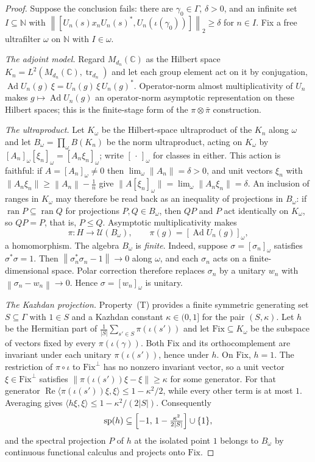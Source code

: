 \documentclass[11pt]{amsart}
\theoremstyle{definition}
\theoremstyle{remark}
\theoremstyle{plain}
\newcommand{\C}{\mathbb C}
\newcommand{\N}{\mathbb N}
\newcommand{\U}{\mathcal U}
\newcommand{\tr}{\operatorname{tr}}
\newcommand{\Ad}{\operatorname{Ad}}
\newcommand{\opnorm}[1]{\left\lVert #1\right\rVert}
\newcommand{\hsnorm}[1]{\left\lVert #1\right\rVert_{2}}
\begin{document}
\begin{proof}
Suppose the conclusion fails: there are $\gamma_0\in\Gamma$,
$\delta>0$, and an infinite set $I\subseteq\N$ with
$\hsnorm{[U_n(s)x_nU_n(s)^*,U_n(\iota(\gamma_0))]}\ge\delta$ for
$n\in I$.  Fix a free ultrafilter $\omega$ on $\N$ with $I\in\omega$.

\emph{The adjoint model.}  Regard $M_{d_n}(\C)$ as the Hilbert space
$K_n=L^2(M_{d_n}(\C),\tr_{d_n})$ and let each group element act on it
by conjugation, $\Ad U_n(g)\,\xi=U_n(g)\,\xi\,U_n(g)^*$.
Operator-norm almost multiplicativity of $U_n$ makes
$g\mapsto\Ad U_n(g)$ an operator-norm asymptotic representation on
these Hilbert spaces; this is the finite-stage form of the
$\pi\otimes\bar\pi$ construction.

\emph{The ultraproduct.}  Let $K_\omega$ be the Hilbert-space
ultraproduct of the $K_n$ along $\omega$ and let
$B_\omega=\prod_\omega B(K_n)$ be the norm ultraproduct, acting on
$K_\omega$ by $[A_n]_\omega[\xi_n]_\omega=[A_n\xi_n]_\omega$; write
$[\,\cdot\,]_\omega$ for classes in either.  This action is faithful:
if $A=[A_n]_\omega\neq0$ then $\lim_\omega\opnorm{A_n}=\delta>0$, and
unit vectors $\xi_n$ with
$\lVert A_n\xi_n\rVert\ge\opnorm{A_n}-\tfrac1n$ give
$\lVert A[\xi_n]_\omega\rVert=\lim_\omega\lVert A_n\xi_n\rVert=\delta$.
An inclusion of ranges in $K_\omega$ may therefore be read back as an
inequality of projections in $B_\omega$: if
$\operatorname{ran}P\subseteq\operatorname{ran}Q$ for projections
$P,Q\in B_\omega$, then $QP$ and $P$ act identically on $K_\omega$,
so $QP=P$, that is, $P\le Q$.
Asymptotic multiplicativity makes
\[
 \pi\colon H\longrightarrow\U(B_\omega),\qquad
 \pi(g)=[\Ad U_n(g)]_\omega,
\]
a homomorphism.  The algebra $B_\omega$ is \emph{finite}.  Indeed,
suppose $\sigma=[\sigma_n]_\omega$ satisfies $\sigma^*\sigma=1$.  Then
$\opnorm{\sigma_n^*\sigma_n-1}\to0$ along $\omega$, and each
$\sigma_n$ acts on a finite-dimensional space.  Polar correction
therefore replaces $\sigma_n$ by a unitary $w_n$ with
$\opnorm{\sigma_n-w_n}\to0$.  Hence $\sigma=[w_n]_\omega$ is unitary.

\emph{The Kazhdan projection.}  Property~\textup{(T)} provides a finite
symmetric generating set $S\subseteq\Gamma$ with $1\in S$ and a Kazhdan
constant $\kappa\in(0,1]$ for the pair $(S,\kappa)$.  Let $h$ be the
Hermitian part of $\frac1{|S|}\sum_{s'\in S}\pi(\iota(s'))$ and let
$\mathrm{Fix}\subseteq K_\omega$ be the subspace of vectors fixed by
every $\pi(\iota(\gamma))$.  Both $\mathrm{Fix}$ and its
orthocomplement are invariant under each unitary $\pi(\iota(s'))$,
hence under $h$.  On $\mathrm{Fix}$, $h=1$.  The restriction of
$\pi\circ\iota$ to $\mathrm{Fix}^\perp$ has no nonzero invariant
vector, so a unit vector $\xi\in\mathrm{Fix}^\perp$ satisfies
$\lVert\pi(\iota(s'))\xi-\xi\rVert\ge\kappa$ for some generator.  For
that generator
$\operatorname{Re}\langle\pi(\iota(s'))\xi,\xi\rangle\le1-\kappa^2/2$,
while every other term is at most $1$.  Averaging gives
$\langle h\xi,\xi\rangle\le1-\kappa^2/(2|S|)$.  Consequently
\[
 \operatorname{sp}(h)\subseteq
 \Bigl[-1,\,1-\tfrac{\kappa^2}{2|S|}\Bigr]\cup\{1\},
\]
and the spectral projection $P$ of $h$ at the isolated point $1$
belongs to $B_\omega$ by continuous functional calculus and projects
onto $\mathrm{Fix}$.


\end{proof}
\end{document}
